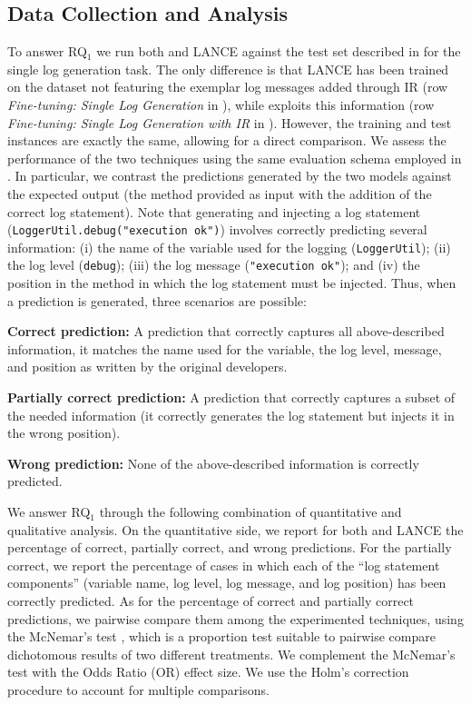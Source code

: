 \subsection{Data Collection and Analysis}

To answer RQ$_1$ we run both \approach and LANCE against the test set described in  for the single log generation task. The only difference is that LANCE has been trained on the dataset not featuring the exemplar log messages added through IR (row \emph{Fine-tuning: Single Log Generation} in ), while \approach exploits this information (row \emph{Fine-tuning: Single Log Generation with IR} in ). However, the training and test instances are exactly the same, allowing for a direct comparison. We assess the performance of the two techniques using the same evaluation schema employed in \cite{mastropaolo2022using}. In particular, we contrast the predictions generated by the two models against the expected output (\ie the \java method provided as input with the addition of the correct log statement). Note that generating and injecting a log statement  (\eg \texttt{LoggerUtil.debug("execution ok")}) involves correctly predicting several information: (i) the name of the variable used for the logging (\ie \texttt{LoggerUtil}); (ii) the log level (\ie \texttt{debug}); (iii) the log message (\ie \texttt{"execution ok"}); and (iv) the position in the method in which the log statement must be injected. Thus, when a prediction is generated, three scenarios are possible:

\textbf{Correct prediction:} A prediction that correctly captures all above-described information, \ie it matches the name used for the variable, the log level, message, and position as written by the original developers.

\textbf{Partially correct prediction:} A prediction that correctly captures a subset of the needed information (\eg it correctly generates the log statement but injects it in the wrong position).

\textbf{Wrong prediction:} None of the above-described information is correctly predicted.

We answer RQ$_1$ through the following combination of quantitative and qualitative analysis. On the quantitative side, we report for both \approach and LANCE the percentage of correct, partially correct, and wrong predictions. For the partially correct, we report the percentage of cases in which each of the ``log statement components'' (\ie variable name, log level, log message, and log position) has been correctly predicted. As for the percentage of correct and partially correct predictions, we pairwise compare them among the experimented techniques, using the McNemar's test \cite{mcnemar}, which is a proportion test suitable to pairwise compare dichotomous results of two different treatments. We complement the McNemar's test with the Odds Ratio (OR) effect size. We use the Holm's correction procedure \cite{Holm1979a} to account for multiple comparisons.


